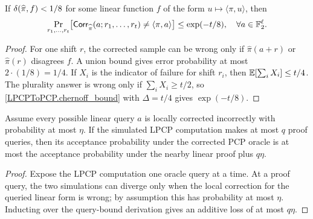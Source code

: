 \begin{lemma}
\label{LPCPToPCP.local_correction}
\leanok
If \(\delta({\widehat{\pi}}, {f}) < 1 / 8\) for some linear
function \(f\) of the form \(u\mapsto\langle\pi,u\rangle\), then
\[
  \Pr_{r_1,\dots,r_t}\!\left[
    \mathsf{Corr}_{\widehat{\pi}}(a;r_1,\dots,r_t)\neq \langle\pi,a\rangle
  \right]
  \leq \exp(-t/8), \quad \forall a\in\mathbb{F}_2^\ell.
\]
\end{lemma}
\begin{proof}\leanok
For one shift \(r\), the corrected sample can be wrong only if
\(\widehat{\pi}(a+r)\) or \(\widehat{\pi}(r)\) disagrees \(f\). A union bound gives error probability at most
\(2\cdot(1/8)=1/4\). If \(X_i\) is the indicator of failure for shift \(r_i\),
then \(\mathbb{E}[\sum_i X_i]\le t/4\). The plurality answer is wrong only if
\(\sum_i X_i\ge t/2\), so \ref{LPCPToPCP.chernoff_bound} with
\(\Delta=t/4\) gives \(\exp(-t/8)\).
\end{proof}

\begin{lemma}
\label{LPCPToPCP.corrected_simulation_hybrid}
\leanok
Assume every possible linear query \(a\) is locally corrected incorrectly with
probability at most \(\eta\). If the simulated LPCP computation makes at most
\(q\) proof queries, then its acceptance probability under the corrected PCP
oracle is at most the acceptance probability under the nearby linear proof
plus \(q\eta\).
\end{lemma}
\begin{proof}\leanok
Expose the LPCP computation one oracle query at a time. At a proof query, the
two simulations can diverge only when the local correction for the queried
linear form is wrong; by assumption this has probability at most \(\eta\).
Inducting over the query-bound derivation gives an additive loss of at most
\(q\eta\).
\end{proof}


